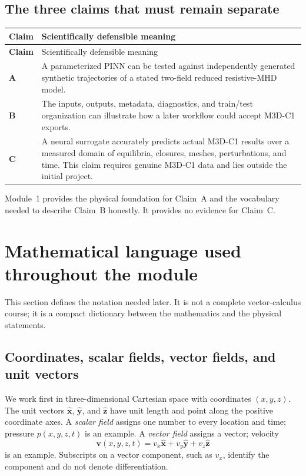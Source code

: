 \documentclass[11pt]{article}
\newcommand{\vect}[1]{\bm{#1}}
\begin{document}
\subsection{The three claims that must remain separate}

\begin{longtable}{>{\bfseries}p{}p{}}
\toprule
Claim & Scientifically defensible meaning \\
\midrule
\endfirsthead
\toprule
Claim & Scientifically defensible meaning \\
\midrule
\endhead
A & A parameterized PINN can be tested against independently generated synthetic trajectories of a stated two-field reduced resistive-MHD model. \\
B & The inputs, outputs, metadata, diagnostics, and train/test organization can illustrate how a later workflow could accept M3D-C1 exports. \\
C & A neural surrogate accurately predicts actual M3D-C1 results over a measured domain of equilibria, closures, meshes, perturbations, and time. This claim requires genuine M3D-C1 data and lies outside the initial project. \\
\bottomrule
\end{longtable}

Module~1 provides the physical foundation for Claim~A and the vocabulary needed to describe Claim~B honestly. It provides no evidence for Claim~C.

\section{Mathematical language used throughout the module}
\label{sec:math}

This section defines the notation needed later. It is not a complete vector-calculus course; it is a compact dictionary between the mathematics and the physical statements.

\subsection{Coordinates, scalar fields, vector fields, and unit vectors}

We work first in three-dimensional Cartesian space with coordinates $(x,y,z)$. The unit vectors $\widehat{\vect{x}}$, $\widehat{\vect{y}}$, and $\widehat{\vect{z}}$ have unit length and point along the positive coordinate axes. A \emph{scalar field} assigns one number to every location and time; pressure $p(x,y,z,t)$ is an example. A \emph{vector field} assigns a vector; velocity
\begin{equation}
\vect{v}(x,y,z,t)=v_x\widehat{\vect{x}}+v_y\widehat{\vect{y}}+v_z\widehat{\vect{z}}
\end{equation}
is an example. Subscripts on a vector component, such as $v_x$, identify the component and do not denote differentiation.
\end{document}
